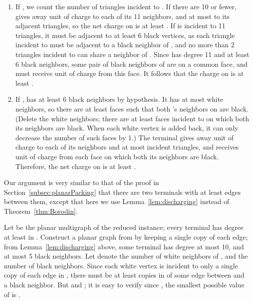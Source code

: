 \documentclass[11pt]{article}
\renewenvironment{proof}{\vspace{-0.1in}\noindent{\bf Proof:}}{\hspace*{\fill}\par}
\newenvironment{proofof}[1]{\smallskip\noindent{\bf Proof of #1:}}{\hspace*{\fill}\par}
\begin{document}
\begin{proof}
\begin{enumerate}
  \item If , we count the number of triangles incident to
    . If there are 10 or fewer,  gives away  unit of charge
    to each of its 11 neighbors, and at most  to its adjacent
    triangles, so the net charge on  is at least . If  is incident to 11 triangles, it must be adjacent
    to at least 6 black vertices, as each triangle incident to 
    must be adjacent to a black neighbor of , and no more than 2
    triangles incident to  can share a neighbor of . Since 
    has degree 11 and at least 6 black neighbors, some pair of black
    neighbors of  are on a common face, and  must receive 
    unit of charge from this face. It follows that the charge on 
    is at least . 

  \item If ,  has at least 6 black neighbors by
    hypothesis. It has at most  white neighbors, so there are
    at least  faces  such that both 's
    neighbors on  are black. (Delete the white neighbors; there are
    at least  faces incident to  on which both its neighbors are
    black. When each white vertex is added back, it can only decrease
    the number of such faces by 1.) The terminal  gives away 
    unit of charge to each of its  neighbors and at most 
    incident triangles, and receives  unit of charge from each
    face on which both its neighbors are black. Therefore, the net
    charge on  is at least .
  \end{enumerate}
  \vspace{-0.35in}
\end{proof}

\bigskip
\begin{proofof}{Lemma~\ref{lem:parallelEdges}}
  Our argument is very similar to that of the proof in
  Section~\ref{subsec:planarPacking} that there are two terminals with
    at least  edges between them, except that here we use
    Lemma~\ref{lem:discharging} instead of Theorem~\ref{thm:Borodin}.

    Let  be the planar multigraph of the reduced instance; every
    terminal has degree at least  in . Construct a planar graph
     from  by keeping a single copy of each edge; from
    Lemma~\ref{lem:discharging} above, some terminal  has degree at
    most 10, and at most 5 black neighbors. Let  denote the number
    of white neighbors of , and  the number of black neighbors.
    Since each white vertex is incident to only a single copy of each
    edge in , there must be at least  copies in
     of some edge between  and a black neighbor. But 
    and ; it is easy to verify since , the
    smallest possible value of  is .
\end{proofof}
\end{document}
